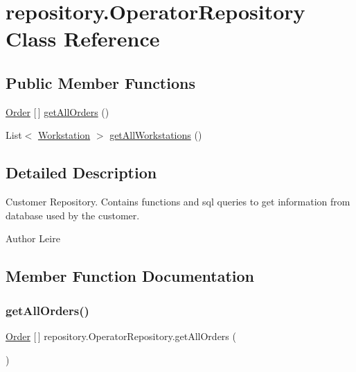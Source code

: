 \hypertarget{classrepository_1_1_operator_repository}{}\section{repository.\+Operator\+Repository Class Reference}
\label{classrepository_1_1_operator_repository}
\subsection*{Public Member Functions}
\begin{DoxyCompactItemize}
\item 
\mbox{\hyperlink{classentity_1_1_order}{Order}} \mbox{[}$\,$\mbox{]} \mbox{\hyperlink{classrepository_1_1_operator_repository_ac371d50c4b824da2d066da12be265aef}{get\+All\+Orders}} ()
\item 
List$<$ \mbox{\hyperlink{classentity_1_1_workstation}{Workstation}} $>$ \mbox{\hyperlink{classrepository_1_1_operator_repository_a850e14590815e5590a93ab13020c198a}{get\+All\+Workstations}} ()
\end{DoxyCompactItemize}


\subsection{Detailed Description}
Customer Repository. Contains functions and sql queries to get information from database used by the customer.

\begin{DoxyAuthor}{Author}
Leire 
\end{DoxyAuthor}


\subsection{Member Function Documentation}
\mbox{\label{classrepository_1_1_operator_repository_ac371d50c4b824da2d066da12be265aef}} 
\subsubsection{\texorpdfstring{get\+All\+Orders()}{getAllOrders()}}
{\footnotesize\ttfamily \mbox{\hyperlink{classentity_1_1_order}{Order}} \mbox{[}$\,$\mbox{]} repository.\+Operator\+Repository.\+get\+All\+Orders (\begin{DoxyParamCaption}{ }\end{DoxyParamCaption})\hspace{0.3cm}{\ttfamily [inline]}}


